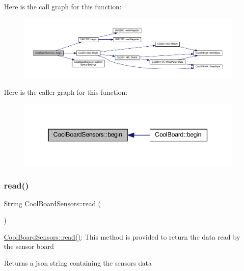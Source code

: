 Here is the call graph for this function\+:\nopagebreak
\begin{figure}[H]
\begin{center}
\leavevmode
\includegraphics[width=350pt]{de/d46/class_cool_board_sensors_a97095823ef7c8f5290812f1405b966b3_cgraph}
\end{center}
\end{figure}
Here is the caller graph for this function\+:\nopagebreak
\begin{figure}[H]
\begin{center}
\leavevmode
\includegraphics[width=336pt]{de/d46/class_cool_board_sensors_a97095823ef7c8f5290812f1405b966b3_icgraph}
\end{center}
\end{figure}
\mbox{\label{class_cool_board_sensors_a91badb2539d91fda8679f2a597874c48}} 
\subsubsection{\texorpdfstring{read()}{read()}}
{\footnotesize\ttfamily String Cool\+Board\+Sensors\+::read (\begin{DoxyParamCaption}{ }\end{DoxyParamCaption})}

\hyperlink{class_cool_board_sensors_a91badb2539d91fda8679f2a597874c48}{Cool\+Board\+Sensors\+::read()}\+: This method is provided to return the data read by the sensor board

\begin{DoxyReturn}{Returns}
a json string containing the sensors data 
\end{DoxyReturn}


